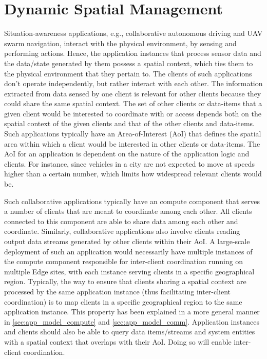 \section{Dynamic Spatial Management}
\label{sec:spatial_ctx_mgmt}
\par Situation-awareness applications, e.g., collaborative autonomous driving and UAV swarm navigation, interact with the physical environment, by sensing and performing actions. Hence, the application instances that process sensor data and the data/state generated by them possess a spatial context, which ties them to the physical environment that they pertain to. The clients of such applications don't operate independently, but rather interact with each other. The information extracted from data sensed by one client is relevant for other clients because they could share the same spatial context. The set of other clients or data-items that a given client would be interested to coordinate with or access depends both on the spatial context of the given clients and that of the other clients and data-items. Such applications typically have an Area-of-Interest (AoI) that defines the spatial area within which a client would be interested in other clients or data-items. The AoI for an application is dependent on the nature of the application logic and clients. For instance, since vehicles in a city are not expected to move at speeds higher than a certain number, which limits how widespread relevant clients would be.
\par Such collaborative applications typically have an compute component that serves a number of clients that are meant to coordinate among each other. All clients connected to this component are able to share data among each other and coordinate. Similarly, collaborative applications also involve clients reading output data streams generated by other clients within their AoI. A large-scale deployment of such an application would necessarily have multiple instances of the compute component responsible for inter-client coordination running on multiple Edge sites, with each instance serving clients in a specific geographical region. Typically, the way to ensure that clients sharing a spatial context are processed by the same application instance (thus facilitating inter-client coordination) is to map clients in a specific geographical region to the same application instance. This property has been explained in a more general manner in \cref{sec:app_model_compute} and \cref{sec:app_model_comm}. Application instances and clients should also be able to query data items/streams and system entities with a spatial context that overlaps with their AoI. Doing so will enable inter-client coordination.
